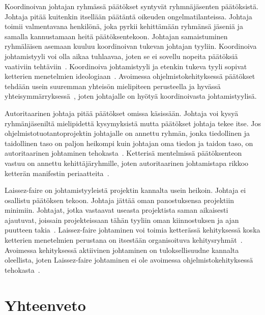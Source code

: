\documentclass[finnish]{tktltiki2}
\theoremstyle{definition}
\theoremstyle{remark}
\begin{document}
Koordinoivan johtajan ryhmässä päätökset syntyvät ryhmnäjäsenten päätöksistä. Johtaja pitää kuitenkin itsellään päätäntä oikeuden ongelmatilanteissa. Johtaja toimii valmentavana henkilönä, joka pyrkii kehittämään ryhmänsä jäseniä ja samalla kannustamaan heitä päätöksentekoon. Johtajan samaistuminen ryhmäläisen asemaan kuuluu koordinoivan tukevan johtajan tyyliin. Koordinoiva johtamistyyli voi olla aikaa tuhlaavaa, joten se ei sovellu nopeita päätöksiä vaativiin tehtäviin~\cite{Dhomne:2012:ITL:2382887.2382899}. Koordinoiva johtamistyyli ja etenkin tukeva tyyli sopivat ketterien menetelmien ideologiaan~\cite{fowler2001agile}. Avoimessa ohjelmistokehityksessä päätökset tehdään usein suuremman yhteisön mielipiteen perusteella ja hyvässä yhteisymmärryksessä~\cite{1385637}, joten johtajalle on hyötyä koordinoivasta johtamistyylisä.

Autoritaarinen johtaja pitää päätökset omissa käsissään. Johtaja voi kysyä ryhmänjäseniltä mielipidettä kysymyksistä mutta päätökset johtaja tekee itse. Jos ohjelmistotuotantoprojektin johtajalle on annettu ryhmän, jonka tiedollinen ja taidollinen taso on paljon heikompi kuin johtajan oma tiedon ja taidon taso, on autoritaarinen johtaminen tehokasta~\cite{Dhomne:2012:ITL:2382887.2382899}. Ketterisä mentelmissä päätöksenteon vastuu on annettu kehittäjäryhmille, joten autoritaarinen johtamistapa rikkoo ketterän manifestin periaatteita~\cite{fowler2001agile}.

Laissez-faire on johtamistyyleistä projektin kannalta usein heikoin. Johtaja ei osallistu päätöksen tekoon. Johtaja jättää oman panostuksensa projektiin minimiin. Johtajat, jotka vastaavat useasta projektista saman aikaisesti ajautuvat, joissain projekteissaan tähän tyyliin oman kiinnostuksen ja ajan puutteen takia~\cite{Dhomne:2012:ITL:2382887.2382899}. Laissez-faire johtaminen voi toimia ketterässä kehityksessä koska ketterien menetelmien perustana on itsestään organisoituva kehitysryhmät~\cite{fowler2001agile}. Avoimessa kehityksessä aktiivinen johtaminen on tuloksellisuudne kannalta oleellista, joten Laissez-faire johtaminen ei ole avoimessa ohjelmistokehityksessä tehokasta~\cite{Li:2006:MOS:1125170.1125182}.



\section{Yhteenveto}
\end{document}
